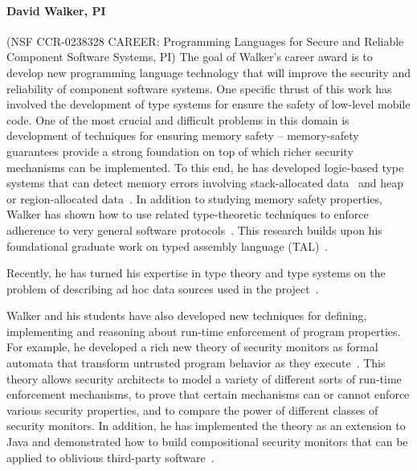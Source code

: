 \documentclass[11pt]{article}
\begin{document}

%

\paragraph*{David Walker, PI} (NSF CCR-0238328 CAREER: Programming Languages for Secure and Reliable Component Software
Systems, PI)
The goal of Walker's career award is to develop new programming language
technology that will improve the security and reliability of component software systems.  
One specific thrust of this work has involved the development of
type systems for ensure the safety of low-level mobile code.
One of the most crucial and difficult problems in this domain
is development of techniques for ensuring memory safety --
memory-safety guarantees 
provide a strong foundation on top of  which
richer security mechanisms can be implemented.  
To this end, he has developed
logic-based type systems that can detect memory errors involving
stack-allocated data~\cite{ahmed+:stack,jia+:stack} and heap or region-allocated
data~\cite{ahmed+:hierarchical-storage}.  In addition to studying memory safety
properties, Walker has shown how to use related type-theoretic techniques
to enforce adherence to very general software
protocols~\cite{mandelbaum+:refinements}.  This research builds 
upon his foundational graduate work on typed assembly language 
(TAL)~\cite{morrisett+:tal,morrisett+:journal-stal}.

Recently, he has turned his expertise in type theory and type systems
on the problem of describing ad hoc data sources used in the
\pads{} project~\cite{fisher+:pads-semantics}.  

Walker and his students have also developed new techniques for defining,
implementing and reasoning about run-time enforcement of program properties.
For example, he developed a rich new theory of security monitors as formal
automata that transform untrusted program behavior as they 
execute~\cite{ligatti+:edit-automata,ligatti+:renewal}.
This theory allows security
architects to model a variety of different sorts of run-time
enforcement mechanisms, to prove that certain mechanisms can or cannot
enforce various security properties, and to compare the power of
different classes of security monitors.    
In addition, he has implemented the theory as 
an extension to Java and demonstrated
how to build compositional security monitors that 
can be applied to oblivious third-party 
software~\cite{bauer+:polymer}.
\end{document}
